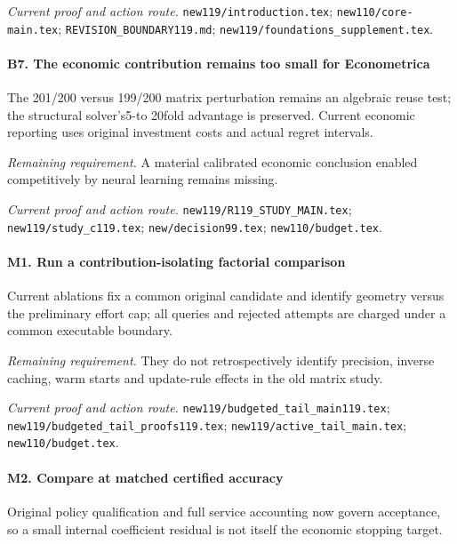 \par\emph{Current proof and action route.} \nolinkurl{new119/introduction.tex}; \nolinkurl{new110/core-main.tex}; \nolinkurl{REVISION_BOUNDARY119.md}; \nolinkurl{new119/foundations_supplement.tex}.

\paragraph{B7. The economic contribution remains too small for Econometrica}

The 201/200 versus 199/200 matrix perturbation remains an algebraic reuse test; the structural solver's5-to 20fold advantage is preserved. Current economic reporting uses original investment costs and actual regret intervals.

\par\emph{Remaining requirement.} A material calibrated economic conclusion enabled competitively by neural learning remains missing.

\par\emph{Current proof and action route.} \nolinkurl{new119/R119_STUDY_MAIN.tex}; \nolinkurl{new119/study_c119.tex}; \nolinkurl{new/decision99.tex}; \nolinkurl{new110/budget.tex}.

\paragraph{M1. Run a contribution-isolating factorial comparison}

Current ablations fix a common original candidate and identify geometry versus the preliminary effort cap; all queries and rejected attempts are charged under a common executable boundary.

\par\emph{Remaining requirement.} They do not retrospectively identify precision, inverse caching, warm starts and update-rule effects in the old matrix study.

\par\emph{Current proof and action route.} \nolinkurl{new119/budgeted_tail_main119.tex}; \nolinkurl{new119/budgeted_tail_proofs119.tex}; \nolinkurl{new119/active_tail_main.tex}; \nolinkurl{new110/budget.tex}.

\paragraph{M2. Compare at matched certified accuracy}

Original policy qualification and full service accounting now govern acceptance, so a small internal coefficient residual is not itself the economic stopping target.

